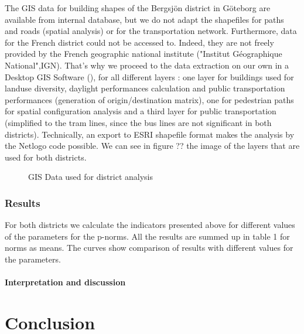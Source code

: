 \documentclass[english]{article}
\begin{document}
The GIS data for building shapes of the Bergsjön district in Göteborg
are available from internal database, but we do not adapt the
shapefiles for paths and roads (spatial analysis) or for the transportation
network. Furthermore, data for the French district could not be accessed to. 
Indeed, they are not freely provided by the French geographic national institute ("Institut Géographique National",IGN). 
That's why we proceed to the data extraction on our own
in a Desktop GIS Software (\cite{QGIS_software}), for all different
layers : one layer for buildings used for landuse diversity, daylight
performances calculation and public transportation performances (generation
of origin/destination matrix), one for pedestrian paths for spatial
configuration analysis and a third layer for public transportation
(simplified to the tram lines, since the bus lines are not significant
in both districts). Technically, an export to ESRI shapefile format
makes the analysis by the Netlogo code possible. We can see
in figure ?? the image of the layers that are used for both districts.

\begin{figure}


\caption{GIS Data used for district analysis}


\end{figure}



\subsubsection{Results}

For both districts we calculate the indicators presented above
for different values of the parameters for the p-norms. All the results
are summed up in table 1 for norms as means. The curves show comparison
of results with different values for the parameters.


\paragraph{Interpretation and discussion}


\section*{Conclusion}

\newpage{}



\end{document}
